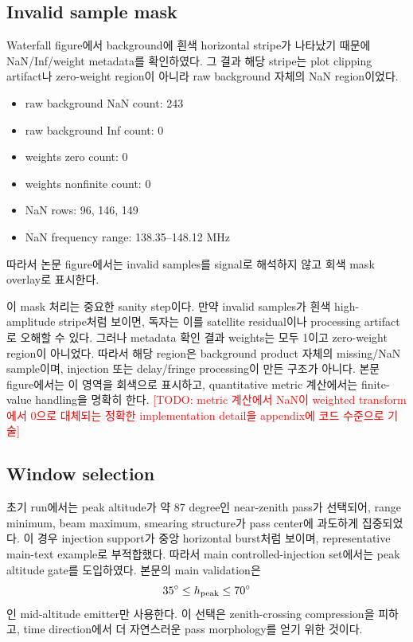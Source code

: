 \documentclass[11pt,a4paper]{article}
\newcommand{\todo}[1]{\textcolor{red}{[TODO: #1]}}
\begin{document}
\subsection{Invalid sample mask}

Waterfall figure에서 background에 흰색 horizontal stripe가 나타났기 때문에 NaN/Inf/weight metadata를 확인하였다.
그 결과 해당 stripe는 plot clipping artifact나 zero-weight region이 아니라 raw background 자체의 NaN region이었다.

\begin{itemize}
  \item raw background NaN count: 243
  \item raw background Inf count: 0
  \item weights zero count: 0
  \item weights nonfinite count: 0
  \item NaN rows: 96, 146, 149
  \item NaN frequency range: 138.35--148.12 MHz
\end{itemize}

따라서 논문 figure에서는 invalid samples를 signal로 해석하지 않고 회색 mask overlay로 표시한다.

이 mask 처리는 중요한 sanity step이다.
만약 invalid samples가 흰색 high-amplitude stripe처럼 보이면, 독자는 이를 satellite residual이나 processing artifact로 오해할 수 있다.
그러나 metadata 확인 결과 weights는 모두 1이고 zero-weight region이 아니었다.
따라서 해당 region은 background product 자체의 missing/NaN sample이며, injection 또는 delay/fringe processing이 만든 구조가 아니다.
본문 figure에서는 이 영역을 회색으로 표시하고, quantitative metric 계산에서는 finite-value handling을 명확히 한다.
\todo{metric 계산에서 NaN이 weighted transform에서 0으로 대체되는 정확한 implementation detail을 appendix에 코드 수준으로 기술}

\subsection{Window selection}

초기 run에서는 peak altitude가 약 87 degree인 near-zenith pass가 선택되어, range minimum, beam maximum, smearing structure가 pass center에 과도하게 집중되었다.
이 경우 injection support가 중앙 horizontal burst처럼 보이며, representative main-text example로 부적합했다.
따라서 main controlled-injection set에서는 peak altitude gate를 도입하였다.
본문의 main validation은
\[
35^\circ \le h_{\rm peak} \le 70^\circ
\]
인 mid-altitude emitter만 사용한다.
이 선택은 zenith-crossing compression을 피하고, time direction에서 더 자연스러운 pass morphology를 얻기 위한 것이다.
\end{document}
